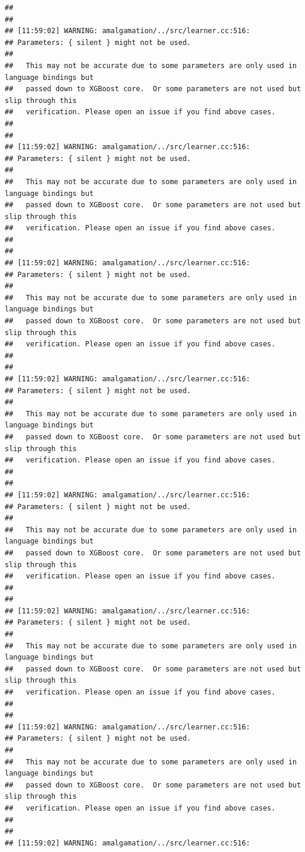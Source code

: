 \documentclass[AMS,STIX2COL]{WileyNJD-v2}\usepackage[]{graphicx}\usepackage[]{color}
\makeatletter
\newenvironment{kframe}{%
 \def\at@end@of@kframe{}%
 \ifinner\ifhmode%
  \def\at@end@of@kframe{\end{minipage}}%
  \begin{minipage}{\columnwidth}%
 \fi\fi%
 \def\FrameCommand##1{\hskip\@totalleftmargin \hskip-\fboxsep
 \colorbox{shadecolor}{##1}\hskip-\fboxsep
     \hskip-\linewidth \hskip-\@totalleftmargin \hskip\columnwidth}%
 \MakeFramed {\advance\hsize-\width
   \@totalleftmargin\z@ \linewidth\hsize
   \@setminipage}}%
 {\par\unskip\endMakeFramed%
 \at@end@of@kframe}
\newenvironment{knitrout}{}{} %
\makeatother
\begin{document}
\begin{knitrout}
\begin{kframe}
\begin{verbatim}
## 
## 
## [11:59:02] WARNING: amalgamation/../src/learner.cc:516: 
## Parameters: { silent } might not be used.
## 
##   This may not be accurate due to some parameters are only used in language bindings but
##   passed down to XGBoost core.  Or some parameters are not used but slip through this
##   verification. Please open an issue if you find above cases.
## 
## 
## [11:59:02] WARNING: amalgamation/../src/learner.cc:516: 
## Parameters: { silent } might not be used.
## 
##   This may not be accurate due to some parameters are only used in language bindings but
##   passed down to XGBoost core.  Or some parameters are not used but slip through this
##   verification. Please open an issue if you find above cases.
## 
## 
## [11:59:02] WARNING: amalgamation/../src/learner.cc:516: 
## Parameters: { silent } might not be used.
## 
##   This may not be accurate due to some parameters are only used in language bindings but
##   passed down to XGBoost core.  Or some parameters are not used but slip through this
##   verification. Please open an issue if you find above cases.
## 
## 
## [11:59:02] WARNING: amalgamation/../src/learner.cc:516: 
## Parameters: { silent } might not be used.
## 
##   This may not be accurate due to some parameters are only used in language bindings but
##   passed down to XGBoost core.  Or some parameters are not used but slip through this
##   verification. Please open an issue if you find above cases.
## 
## 
## [11:59:02] WARNING: amalgamation/../src/learner.cc:516: 
## Parameters: { silent } might not be used.
## 
##   This may not be accurate due to some parameters are only used in language bindings but
##   passed down to XGBoost core.  Or some parameters are not used but slip through this
##   verification. Please open an issue if you find above cases.
## 
## 
## [11:59:02] WARNING: amalgamation/../src/learner.cc:516: 
## Parameters: { silent } might not be used.
## 
##   This may not be accurate due to some parameters are only used in language bindings but
##   passed down to XGBoost core.  Or some parameters are not used but slip through this
##   verification. Please open an issue if you find above cases.
## 
## 
## [11:59:02] WARNING: amalgamation/../src/learner.cc:516: 
## Parameters: { silent } might not be used.
## 
##   This may not be accurate due to some parameters are only used in language bindings but
##   passed down to XGBoost core.  Or some parameters are not used but slip through this
##   verification. Please open an issue if you find above cases.
## 
## 
## [11:59:02] WARNING: amalgamation/../src/learner.cc:516: 

\end{verbatim}
\end{kframe}
\end{knitrout}
\end{document}
